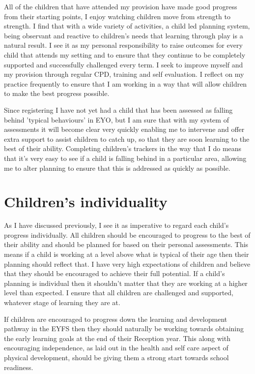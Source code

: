 \documentclass[10pt,a4paper]{report}
\begin{document}
All of the children that have attended my provision have made good progress from their starting points, I enjoy watching children move from strength to strength. I find that with a wide variety of activities, a child led planning system, being observant and reactive to children's needs that learning through play is a natural result. I see it as my personal responsibility to raise outcomes for every child that attends my setting and to ensure that they continue to be completely supported and successfully challenged every term. I seek to improve myself and my provision through regular CPD, training and self evaluation. I reflect on my practice frequently to ensure that I am working in a way that will allow children to make the best progress possible. 

Since registering I have not yet had a child that has been assessed as falling behind 'typical behaviours' in EYO, but I am sure that with my system of assessments it will become clear very quickly enabling me to intervene and offer extra support to assist children to catch up, so that they are soon learning to the best of their ability. Completing children's trackers in the way that I do means that it's very easy to see if a child is falling behind in a particular area, allowing me to alter planning to ensure that this is addressed as quickly as possible.

\section{Children's individuality}

As I have discussed previously, I see it as imperative to regard each child's progress individually. All children should be encouraged to progress to the best of their ability and should be planned for based on their personal assessments. This means if a child is working at a level above what is typical of their age then their planning should reflect that. I have very high expectations of children and believe that they should be encouraged to achieve their full potential. If a child's planning is individual then it shouldn't matter that they are working at a higher level than expected. I ensure that all children are challenged and supported, whatever stage of learning they are at.

If children are encouraged to progress down the learning and development pathway in the EYFS then they should naturally be working towards obtaining the early learning goals at the end of their Reception year. This along with encouraging independence, as laid out in the health and self care aspect of physical development, should be giving them a strong start towards school readiness.
\end{document}
